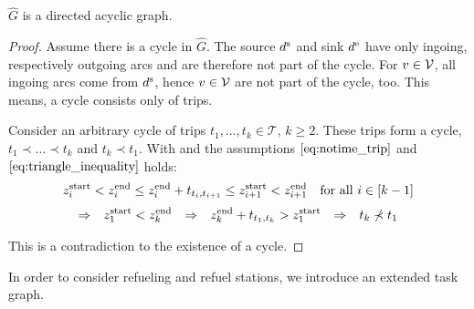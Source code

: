 \begin{lemma}
\label{lem:taskgraph_cyclefree}

$\hat{G}$ is a directed acyclic graph.

\end{lemma}

\begin{proof}

Assume there is a cycle in $\hat{G}$. The source $d^{\operatorname{s}}$ and sink $d^{\operatorname{e}}$ have only ingoing, respectively outgoing arcs and are therefore not part of the cycle. For $v\in\mathcal{V}$, all ingoing arcs come from $d^{\operatorname{s}}$, hence $v\in\mathcal{V}$ are not part of the cycle, too. This means, a cycle consists only of trips.

Consider an arbitrary cycle of trips $t_1,\dots,t_k\in\mathcal{T}$, $k\geq 2$. These trips form a cycle, \ie ${t_1\prec\dots\prec t_k}$ and ${t_k\prec t_1}$. With  and the assumptions $\eqref{eq:notime_trip}$ and $\eqref{eq:triangle_inequality}$ holds:
\begin{align*}
	z^{\operatorname{start}}_i < z^{\operatorname{end}}_i \leq z^{\operatorname{end}}_i + t_{t_i,t_{i+1}} \leq z^{\operatorname{start}}_{i+1} < z^{\operatorname{end}}_{i+1} && \text{for all } i\in[k-1]
\end{align*}
\begin{align*}
	\Rightarrow && z^{\operatorname{start}}_1 < z^{\operatorname{end}}_k && \Rightarrow && z^{\operatorname{end}}_k + t_{t_1,t_k} > z^{\operatorname{start}}_1 && \Rightarrow && t_k\not\prec t_1
\end{align*}

This is a contradiction to the existence of a cycle.

\end{proof}

In order to consider refueling and refuel stations, we introduce an extended task graph.

